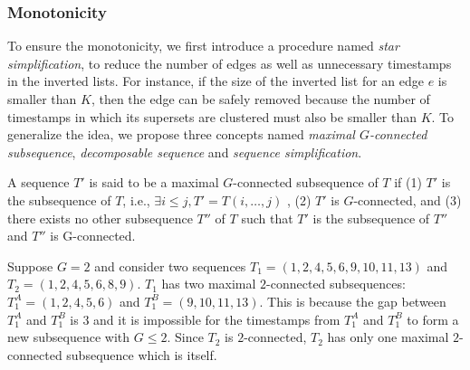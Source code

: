 \subsubsection{Monotonicity}
To ensure the monotonicity, we first introduce a procedure named \textit{star simplification}, to reduce the number of edges as well as unnecessary timestamps in the inverted lists. For instance, if the size of the inverted list for an edge $e$ is smaller than $K$, then the edge can be safely removed because the number of timestamps in which its supersets are clustered must also be smaller than $K$. To generalize the idea, we propose three concepts named \textit{maximal $G$-connected subsequence}, \emph{decomposable sequence} and \emph{sequence simplification}.

\begin{definition}
A sequence $T'$ is said to be a maximal $G$-connected subsequence of $T$ if (1) $T'$ is the subsequence of $T$, i.e., $\exists i\leq j, T' = T(i,\ldots,j)$ , (2) $T'$ is $G$-connected, and (3) there exists no other subsequence $T''$ of $T$ such that $T'$ is the subsequence of $T''$ and $T''$ is G-connected.
\end{definition}

\begin{example}
Suppose $G=2$ and consider two sequences $T_1=(1,2,4,5,6,9,10,11,13)$ and $T_2=(1,2,4,5,6,8,9)$. $T_1$ has two maximal $2$-connected subsequences:$T_1^A=(1,2,4,5,6)$ and $T_1^B=(9,10,11,13)$. This is because the gap between $T_1^A$ and $T_1^B$ is $3$ and it is impossible for the timestamps from  $T_1^A$ and $T_1^B$ to form a new subsequence with $G\leq 2$. Since $T_2$ is $2$-connected, $T_2$ has only one maximal $2$-connected subsequence which is
itself. 
\end{example}


